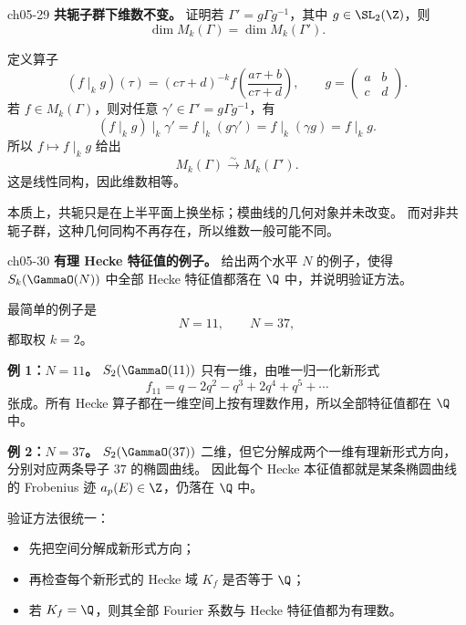 \begin{problem}{ch05-29}
\textbf{共轭子群下维数不变。}
证明若 $\Gamma' = g\Gamma g^{-1}$，其中 $g\in \SL_2(\Z)$，则
\[
\dim M_k(\Gamma)=\dim M_k(\Gamma').
\]
\end{problem}
\begin{solution}
定义算子
\[
(f\mid_k g)(\tau)=(c\tau+d)^{-k}f\!\left(\frac{a\tau+b}{c\tau+d}\right),
\qquad
g=\begin{pmatrix}a&b\\ c&d\end{pmatrix}.
\]
若 $f\in M_k(\Gamma)$，则对任意 $\gamma'\in \Gamma'=g\Gamma g^{-1}$，有
\[
(f\mid_k g)\mid_k \gamma'=f\mid_k(g\gamma')=f\mid_k(\gamma g)=f\mid_k g.
\]
所以 $f\mapsto f\mid_k g$ 给出
\[
M_k(\Gamma)\xrightarrow{\sim} M_k(\Gamma').
\]
这是线性同构，因此维数相等。

本质上，共轭只是在上半平面上换坐标；模曲线的几何对象并未改变。
而对非共轭子群，这种几何同构不再存在，所以维数一般可能不同。
\end{solution}

\begin{problem}{ch05-30}
\textbf{有理 Hecke 特征值的例子。}
给出两个水平 $N$ 的例子，使得 $S_k(\GammaO(N))$ 中全部 Hecke 特征值都落在 $\Q$ 中，并说明验证方法。
\end{problem}
\begin{solution}
最简单的例子是
\[
N=11,\qquad N=37,
\]
都取权 $k=2$。

\textbf{例 1：$N=11$。}
$S_2(\GammaO(11))$ 只有一维，由唯一归一化新形式
\[
f_{11}=q-2q^2-q^3+2q^4+q^5+\cdots
\]
张成。所有 Hecke 算子都在一维空间上按有理数作用，所以全部特征值都在 $\Q$ 中。

\textbf{例 2：$N=37$。}
$S_2(\GammaO(37))$ 二维，但它分解成两个一维有理新形式方向，分别对应两条导子 $37$ 的椭圆曲线。
因此每个 Hecke 本征值都就是某条椭圆曲线的 Frobenius 迹 $a_p(E)\in\Z$，仍落在 $\Q$ 中。

验证方法很统一：
\begin{itemize}
  \item 先把空间分解成新形式方向；
  \item 再检查每个新形式的 Hecke 域 $K_f$ 是否等于 $\Q$；
  \item 若 $K_f=\Q$，则其全部 Fourier 系数与 Hecke 特征值都为有理数。
\end{itemize}
\end{solution}
